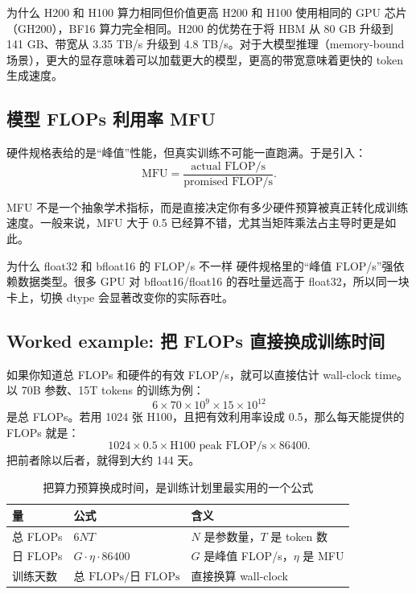 \documentclass[a4paper]{article}
\begin{document}
\begin{knowledgebox}{为什么 H200 和 H100 算力相同但价值更高}
H200 和 H100 使用相同的 GPU 芯片（GH200），BF16 算力完全相同。H200 的优势在于将 HBM 从 80 GB 升级到 141 GB、带宽从 3.35 TB/s 升级到 4.8 TB/s。对于大模型推理（memory-bound 场景），更大的显存意味着可以加载更大的模型，更高的带宽意味着更快的 token 生成速度。
\end{knowledgebox}

\subsection{模型 FLOPs 利用率 MFU}

硬件规格表给的是“峰值”性能，但真实训练不可能一直跑满。于是引入：
\[
\text{MFU} = \frac{\text{actual FLOP/s}}{\text{promised FLOP/s}}.
\]

MFU 不是一个抽象学术指标，而是直接决定你有多少硬件预算被真正转化成训练速度。一般来说，MFU 大于 0.5 已经算不错，尤其当矩阵乘法占主导时更是如此。

\begin{warningbox}{为什么 float32 和 bfloat16 的 FLOP/s 不一样}
硬件规格里的“峰值 FLOP/s”强依赖数据类型。很多 GPU 对 bfloat16/float16 的吞吐量远高于 float32，所以同一块卡上，切换 dtype 会显著改变你的实际吞吐。
\end{warningbox}

\subsection{Worked example: 把 FLOPs 直接换成训练时间}

如果你知道总 FLOPs 和硬件的有效 FLOP/s，就可以直接估计 wall-clock time。以 70B 参数、15T tokens 的训练为例：
\[
6 \times 70\times 10^9 \times 15\times 10^{12}
\]
是总 FLOPs。若用 1024 张 H100，且把有效利用率设成 0.5，那么每天能提供的 FLOPs 就是：
\[
1024 \times 0.5 \times \text{H100 peak FLOP/s} \times 86400.
\]
把前者除以后者，就得到大约 144 天。

\begin{table}[H]
\centering
\begin{tabular}{p{}p{}p{}}
\toprule
\textbf{量} & \textbf{公式} & \textbf{含义} \\
\midrule
总 FLOPs & \(6NT\) & \(N\) 是参数量，\(T\) 是 token 数 \\
日 FLOPs & \(G \cdot \eta \cdot 86400\) & \(G\) 是峰值 FLOP/s，\(\eta\) 是 MFU \\
训练天数 & \(\text{总 FLOPs}/\text{日 FLOPs}\) & 直接换算 wall-clock \\
\bottomrule
\end{tabular}
\caption{把算力预算换成时间，是训练计划里最实用的一个公式}
\end{table}
\end{document}
